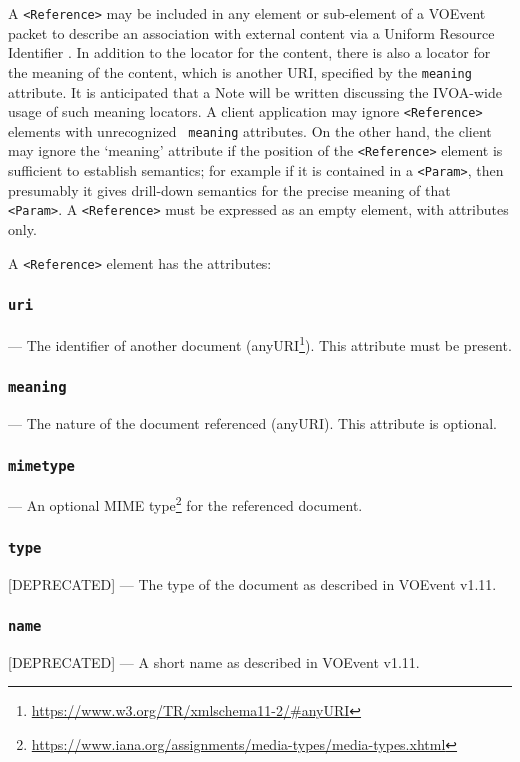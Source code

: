 \documentclass[11pt,a4paper]{ivoa}
\begin{document}
A \texttt{<Reference>} may be included in any element or sub-element of a VOEvent 
packet to describe an association with external content via a Uniform Resource 
Identifier \citep{2016ivoa.spec.0523D}. In addition to the locator for the 
content, there is also a locator for the meaning of the content, which is 
another URI, specified by the \texttt{meaning} attribute. It is anticipated that a 
Note will be written discussing the IVOA-wide usage of such meaning locators. A 
client application may ignore \texttt{<Reference>} elements with unrecognized \texttt{
meaning} attributes. On the other hand, the client may ignore the `meaning' 
attribute if the position of the \texttt{<Reference>} element is sufficient to 
establish semantics; for example if it is contained in a \texttt{<Param>}, then 
presumably it gives drill-down semantics for the precise meaning of that \texttt{
<Param>}. A \texttt{<Reference>} must be expressed as an empty element, with 
attributes only. 

A \texttt{<Reference>} element has the attributes: 
\subsubsection{\texttt{uri}}\label{sec:3.9.1}--- The identifier of another document 
(anyURI\footnote{\url{https://www.w3.org/TR/xmlschema11-2/\#anyURI}}). This 
attribute must be present. 
\subsubsection{\texttt{meaning}}\label{sec:3.9.2}--- The nature of the document 
referenced (anyURI). This attribute is optional. 
\subsubsection{\texttt{mimetype}}\label{sec:3.9.3}--- An optional MIME type\footnote{
\url{https://www.iana.org/assignments/media-types/media-types.xhtml}} for the 
referenced document. 
\subsubsection{\texttt{type}}\label{sec:3.9.4}[DEPRECATED] --- The type of the 
document as described in VOEvent v1.11. 
\subsubsection{\texttt{name}}\label{sec:3.9.5}[DEPRECATED] --- A short name as 
described in VOEvent v1.11. 
\end{document}
